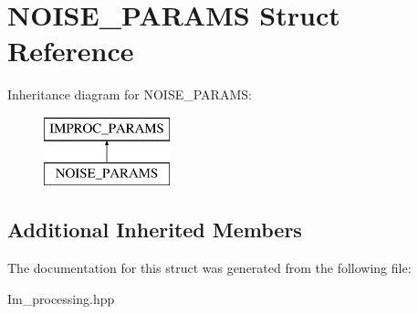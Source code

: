 \hypertarget{struct_n_o_i_s_e___p_a_r_a_m_s}{\section{N\+O\+I\+S\+E\+\_\+\+P\+A\+R\+A\+M\+S Struct Reference}
\label{struct_n_o_i_s_e___p_a_r_a_m_s}
}
Inheritance diagram for N\+O\+I\+S\+E\+\_\+\+P\+A\+R\+A\+M\+S\+:\begin{figure}[H]
\begin{center}
\leavevmode
\includegraphics[height=2.000000cm]{struct_n_o_i_s_e___p_a_r_a_m_s}
\end{center}
\end{figure}
\subsection*{Additional Inherited Members}


The documentation for this struct was generated from the following file\+:\begin{DoxyCompactItemize}
\item 
Im\+\_\+processing.\+hpp\end{DoxyCompactItemize}
